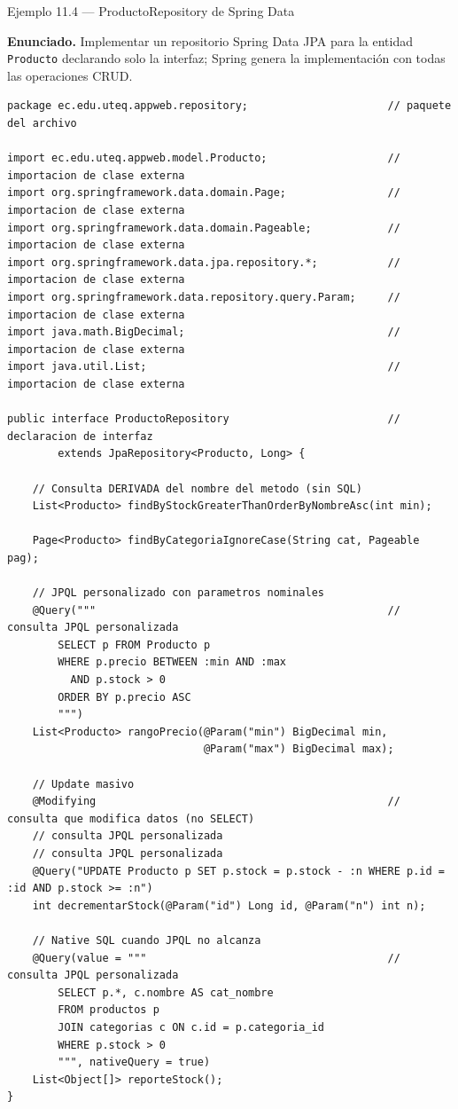 \documentclass[11pt,a4paper,openany]{book}
\begin{document}
\begin{cajaejemplo}{Ejemplo 11.4 --- ProductoRepository de Spring Data}

\textbf{Enunciado.} Implementar un repositorio Spring Data JPA para la entidad \texttt{Producto} declarando solo la interfaz; Spring genera la implementación con todas las operaciones CRUD.

\begin{lstlisting}[style=java,caption={ProductoRepository.java},label=lst:11.7]
package ec.edu.uteq.appweb.repository;                      // paquete del archivo

import ec.edu.uteq.appweb.model.Producto;                   // importacion de clase externa
import org.springframework.data.domain.Page;                // importacion de clase externa
import org.springframework.data.domain.Pageable;            // importacion de clase externa
import org.springframework.data.jpa.repository.*;           // importacion de clase externa
import org.springframework.data.repository.query.Param;     // importacion de clase externa
import java.math.BigDecimal;                                // importacion de clase externa
import java.util.List;                                      // importacion de clase externa

public interface ProductoRepository                         // declaracion de interfaz
        extends JpaRepository<Producto, Long> {

    // Consulta DERIVADA del nombre del metodo (sin SQL)
    List<Producto> findByStockGreaterThanOrderByNombreAsc(int min);

    Page<Producto> findByCategoriaIgnoreCase(String cat, Pageable pag);

    // JPQL personalizado con parametros nominales
    @Query("""                                              // consulta JPQL personalizada
        SELECT p FROM Producto p
        WHERE p.precio BETWEEN :min AND :max
          AND p.stock > 0
        ORDER BY p.precio ASC
        """)
    List<Producto> rangoPrecio(@Param("min") BigDecimal min,
                               @Param("max") BigDecimal max);

    // Update masivo
    @Modifying                                              // consulta que modifica datos (no SELECT)
    // consulta JPQL personalizada
    // consulta JPQL personalizada
    @Query("UPDATE Producto p SET p.stock = p.stock - :n WHERE p.id = :id AND p.stock >= :n")
    int decrementarStock(@Param("id") Long id, @Param("n") int n);

    // Native SQL cuando JPQL no alcanza
    @Query(value = """                                      // consulta JPQL personalizada
        SELECT p.*, c.nombre AS cat_nombre
        FROM productos p
        JOIN categorias c ON c.id = p.categoria_id
        WHERE p.stock > 0
        """, nativeQuery = true)
    List<Object[]> reporteStock();
}
\end{lstlisting}
\end{cajaejemplo}
\end{document}
